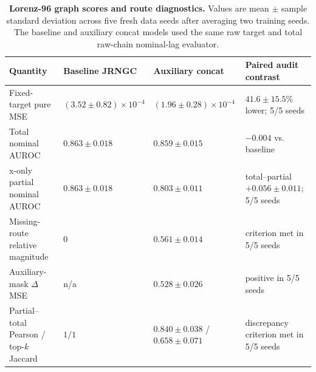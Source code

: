 \begin{table}[!t]
\centering
\caption{\textbf{Lorenz-96 graph scores and route diagnostics.} Values are mean $\pm$ sample standard deviation across five fresh data seeds after averaging two training seeds. The baseline and auxiliary concat models used the same raw target and total raw-chain nominal-lag evaluator.}
\label{tab:lorenz_confirmation}
\footnotesize
\begin{tabularx}{\textwidth}{p{}p{}p{}Y}
\toprule
Quantity & Baseline JRNGC & Auxiliary concat & Paired audit contrast \\
\midrule
Fixed-target pure MSE & $(3.52\pm0.82)\times10^{-4}$ & $(1.96\pm0.28)\times10^{-4}$ & $41.6\pm15.5\%$ lower; 5/5 seeds \\
Total nominal AUROC & $0.863\pm0.018$ & $0.859\pm0.015$ & $-0.004$ vs. baseline \\
x-only partial nominal AUROC & $0.863\pm0.018$ & $0.803\pm0.011$ & total--partial $+0.056\pm0.011$; 5/5 seeds \\
Missing-route relative magnitude & $0$ & $0.561\pm0.014$ & criterion met in 5/5 seeds \\
Auxiliary-mask $\Delta$MSE & n/a & $0.528\pm0.026$ & positive in 5/5 seeds \\
Partial--total Pearson / top-$k$ Jaccard & $1/1$ & $0.840\pm0.038$ / $0.658\pm0.071$ & discrepancy criterion met in 5/5 seeds \\
\bottomrule
\end{tabularx}
\end{table}
